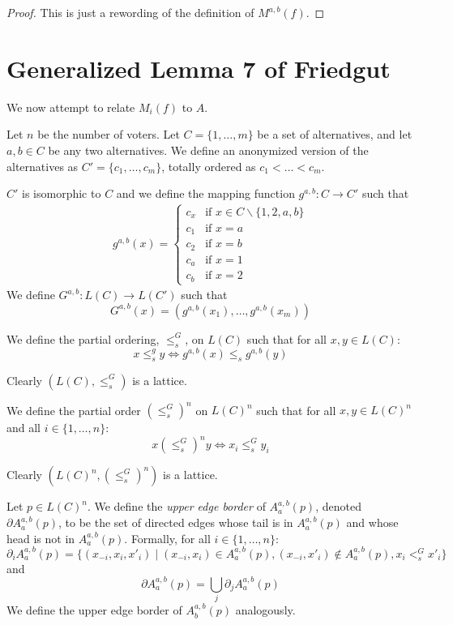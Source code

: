 	\begin{proof}
		This is just a rewording of the definition of $M^{a,b}(f)$.
	\end{proof}


\section{Generalized Lemma 7 of Friedgut}

	We now attempt to relate $M_i(f)$ to $A$.

	Let $n$ be the number of voters. Let $C = \{1, \ldots, m\}$ be a set of alternatives, and let $a,b \in C$ be any two alternatives. We define an anonymized version of the alternatives as $C' = \{c_1, \ldots, c_m\}$, totally ordered as $c_1 < \ldots < c_m$.

	\begin{definition}
		$C'$ is isomorphic to $C$ and we define the mapping function $g^{a,b} : C \to C'$ such that
		\begin{align*}
			g^{a,b}(x) =
			\begin{cases}
				c_x & \textrm{if } x \in C \backslash \{1, 2, a, b\} \\
				c_1 & \textrm{if } x = a \\
				c_2 & \textrm{if } x = b \\
				c_a & \textrm{if } x = 1 \\
				c_b & \textrm{if } x = 2
			\end{cases}
		\end{align*}
		We define $G^{a,b} : L(C) \to L(C')$ such that
		\[
			G^{a,b}(x) = (g^{a,b}(x_1), \ldots, g^{a,b}(x_m))
		\]
	\end{definition}

	\begin{definition}
		We define the partial ordering, $\le^G_s$, on $L(C)$ such that for all $x, y \in L(C)$:
		\[
			x \le^g_s y \iff g^{a,b}(x) \le_s g^{a,b}(y)
		\]
	\end{definition}

	Clearly $(L(C), \le^G_s)$ is a lattice.

	\begin{definition}
		We define the partial order $(\le^G_s)^n$ on $L(C)^n$ such that for all $x,y \in L(C)^n$ and all $i \in \{1, \ldots, n\}$:
		\[
			x (\le^G_s)^n y \iff x_i \le^G_s y_i
		\]
	\end{definition}

	Clearly $(L(C)^n, (\le^G_s)^n)$ is a lattice.

	\begin{definition}
		Let $p \in L(C)^n$. We define the \emph{upper edge border} of $A^{a,b}_a(p)$, denoted $\partial A^{a,b}_a(p)$, to be the set of directed edges whose tail is in $A^{a,b}_a(p)$ and whose head is not in $A^{a,b}_a(p)$. Formally, for all $i \in \{1, \ldots, n\}$:
			\[
				\partial_i A^{a,b}_a(p) = \{ (x_{-i}, x_i, x'_i) \mid (x_{-i}, x_i) \in A^{a,b}_a(p), (x_{-i}, x'_i) \notin A^{a,b}_a(p), x_i <^G_s x'_i \}
			\]
		and
			\[
				\partial A^{a,b}_a(p) = \bigcup_j \partial_j A^{a,b}_a(p)
			\]
		We define the upper edge border of $A^{a,b}_b(p)$ analogously.
	\end{definition}

